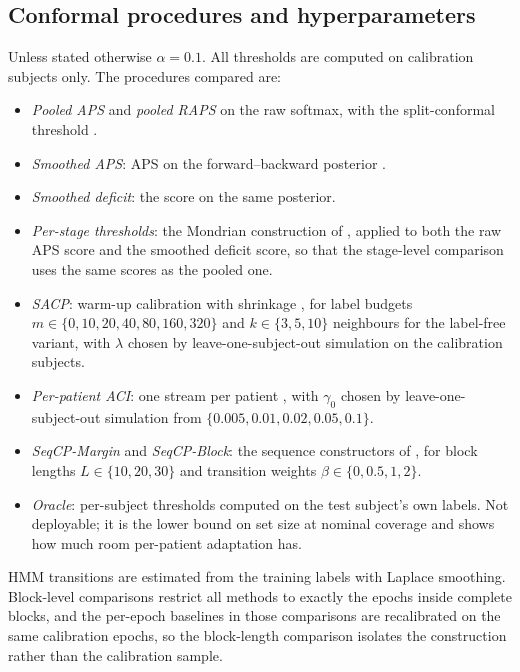 \subsection{Conformal procedures and hyperparameters}
\label{sec:conformal-setup}

Unless stated otherwise $\alpha=0.1$. All thresholds are computed on
calibration subjects only. The procedures compared are:

\begin{itemize}
\item \emph{Pooled APS} and \emph{pooled RAPS} on the raw softmax, with the
      split-conformal threshold .
\item \emph{Smoothed APS}: APS on the forward--backward posterior
      .
\item \emph{Smoothed deficit}: the score  on the same
      posterior.
\item \emph{Per-stage thresholds}: the Mondrian construction of
      , applied to both the raw APS score and the smoothed
      deficit score, so that the stage-level comparison uses the same scores
      as the pooled one.
\item \emph{SACP}: warm-up calibration with shrinkage , for
      label budgets $m\in\{0,10,20,40,80,160,320\}$ and $k\in\{3,5,10\}$
      neighbours for the label-free variant, with $\lambda$ chosen by
      leave-one-subject-out simulation on the calibration subjects.
\item \emph{Per-patient ACI}: one stream per patient ,
      with $\gamma_0$ chosen by leave-one-subject-out simulation from
      $\{0.005,0.01,0.02,0.05,0.1\}$.
\item \emph{SeqCP-Margin} and \emph{SeqCP-Block}: the sequence constructors of
      , for block lengths $L\in\{10,20,30\}$ and
      transition weights $\beta\in\{0,0.5,1,2\}$.
\item \emph{Oracle}: per-subject thresholds computed on the test subject's
      own labels. Not deployable; it is the lower bound on set size at
      nominal coverage and shows how much room per-patient adaptation has.
\end{itemize}

HMM transitions are estimated from the training labels with Laplace
smoothing. Block-level comparisons restrict all methods to exactly the epochs
inside complete blocks, and the per-epoch baselines in those comparisons are
recalibrated on the same calibration epochs, so the block-length comparison
isolates the construction rather than the calibration sample.


